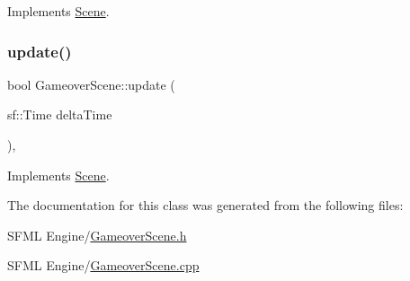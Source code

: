 Implements \hyperlink{class_scene_af25e4d2c998aca4e95899fb67488e815}{Scene}.

\mbox{\label{class_gameover_scene_a6b7f650af840f54c78b4fb1cdf2010df}} 
\subsubsection{\texorpdfstring{update()}{update()}}
{\footnotesize\ttfamily bool Gameover\+Scene\+::update (\begin{DoxyParamCaption}\item[{sf\+::\+Time}]{delta\+Time }\end{DoxyParamCaption})\hspace{0.3cm}{\ttfamily [override]}, {\ttfamily [virtual]}}



Implements \hyperlink{class_scene_a72683c984a1da2ce4f757705e93730f2}{Scene}.



The documentation for this class was generated from the following files\+:\begin{DoxyCompactItemize}
\item 
S\+F\+M\+L Engine/\hyperlink{_gameover_scene_8h}{Gameover\+Scene.\+h}\item 
S\+F\+M\+L Engine/\hyperlink{_gameover_scene_8cpp}{Gameover\+Scene.\+cpp}\end{DoxyCompactItemize}
